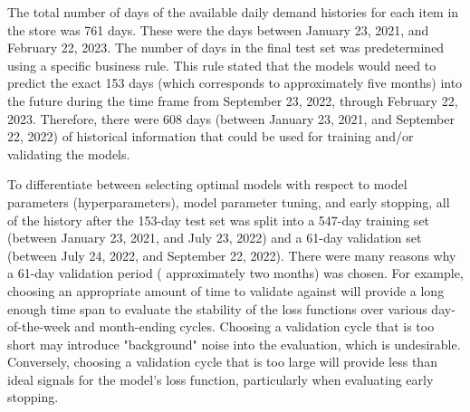 The total number of days of the available daily demand histories for each item in the store was 761 days. These were the days between January 23, 2021, and February 22, 2023. The number of days in the final test set was predetermined using a specific business rule. This rule stated that the models would need to predict the exact 153 days (which corresponds to approximately five months) into the future during the time frame from September 23, 2022, through February 22, 2023. Therefore, there were 608 days (between January 23, 2021, and September 22, 2022) of historical information that could be used for training and/or validating the models.

To differentiate between selecting optimal models with respect to model parameters (hyperparameters), model parameter tuning, and early stopping, all of the history after the 153-day test set was split into a 547-day training set (between January 23, 2021, and July 23, 2022) and a 61-day validation set (between July 24, 2022, and September 22, 2022). There were many reasons why a 61-day validation period ( approximately two months) was chosen. For example, choosing an appropriate amount of time to validate against will provide a long enough time span to evaluate the stability of the loss functions over various day-of-the-week and month-ending cycles. Choosing a validation cycle that is too short may introduce "background" noise into the evaluation, which is undesirable. Conversely, choosing a validation cycle that is too large will provide less than ideal signals for the model's loss function, particularly when evaluating early stopping.

